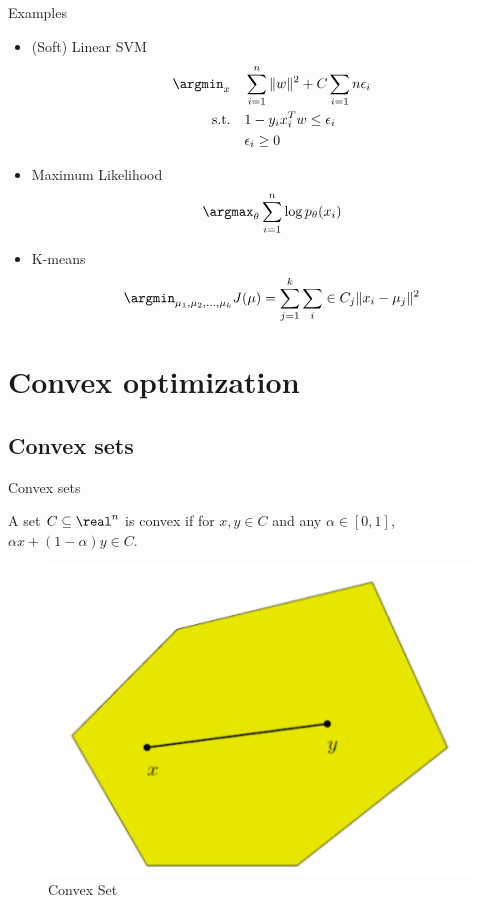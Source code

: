 \documentclass[notes]{beamer}
\begin{document}
\begin{frame}{Examples} 
	\begin{itemize} 
		\item (Soft) Linear SVM 
		\begin{equation}
			\begin{aligned}
				\argmin_x \quad & \sum_{i=1}^{n} \|w\|^2 + C \sum_{i=1}{n} \epsilon_i  \\ 
				\textrm{s.t.} \quad & 1-y_ix_i^Tw\le \epsilon_i \\  
				 		\quad & \epsilon_i \ge 0 \\ 
			\end{aligned}
		\end{equation}
		\item Maximum Likelihood 
		\begin{equation}
			\argmax_\theta \sum_{i=1}^{n} \log p_\theta (x_i)
		\end{equation}
		\item K-means 
		\begin{equation}
			\argmin_{\mu_1,\mu_2,...,\mu_k} J(\mu) = \sum_{j=1}^{k} \sum_i\in C_j \|x_i-\mu_j\|^2 
		\end{equation}
	\end{itemize}
\end{frame}

\section{Convex optimization} 
\subsection{Convex sets} 

\begin{frame}{Convex sets}
\begin{define}
A set $C \subseteq \real^n$ is convex if for $x,y \in C$ and any $\alpha \in [0,1]$, $\alpha x +(1-\alpha)y \in C$. 
\end{define}
\begin{figure}
\includegraphics[width=.45\textwidth]{2018-03-04-21-52-01.png} 
\caption{Convex Set}
\end{figure}

\end{frame}
\end{document}

